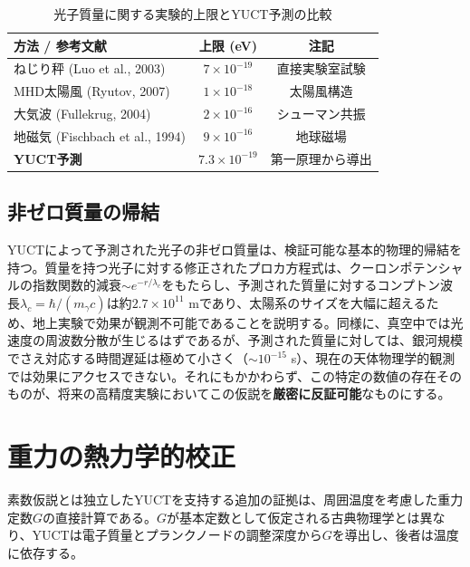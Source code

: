 \documentclass[11pt,a4paper]{article}
\begin{document}
	\begin{table}[h!]
		\centering
		\caption{光子質量に関する実験的上限とYUCT予測の比較}
		\label{tab:photon_limits}
		\small
		\begin{tabular}{lcc}
			\toprule
			\textbf{方法 / 参考文献} & \textbf{上限 (eV)} & \textbf{注記} \\
			\midrule
			ねじり秤 (Luo et al., 2003) & $7\times10^{-19}$ & 直接実験室試験 \\
			MHD太陽風 (Ryutov, 2007) & $1\times10^{-18}$ & 太陽風構造 \\
			大気波 (Fullekrug, 2004) & $2\times10^{-16}$ & シューマン共振 \\
			地磁気 (Fischbach et al., 1994) & $9\times10^{-16}$ & 地球磁場 \\
			\midrule
			\textbf{YUCT予測} & \textbf{$7.3\times10^{-19}$} & 第一原理から導出 \\
			\bottomrule
		\end{tabular}
	\end{table}
	
	\subsection{非ゼロ質量の帰結}
	YUCTによって予測された光子の非ゼロ質量は、検証可能な基本的物理的帰結を持つ。質量を持つ光子に対する修正されたプロカ方程式\cite{Proca1936}は、クーロンポテンシャルの指数関数的減衰$\sim e^{-r/\lambda_c}$をもたらし、予測された質量に対するコンプトン波長$\lambda_c = \hbar / (m_\gamma c)$は約$2.7 \times 10^{11}$ mであり、太陽系のサイズを大幅に超えるため、地上実験で効果が観測不可能であることを説明する。同様に、真空中では光速度の周波数分散が生じるはずであるが、予測された質量に対しては、銀河規模でさえ対応する時間遅延は極めて小さく（$\sim 10^{-15}$ s）、現在の天体物理学的観測では効果にアクセスできない。それにもかかわらず、この特定の数値の存在そのものが、将来の高精度実験においてこの仮説を\textbf{厳密に反証可能}なものにする。
	
	\section{重力の熱力学的校正}
	\label{sec:thermal_gravity}
	
	素数仮説とは独立したYUCTを支持する追加の証拠は、周囲温度を考慮した重力定数$G$の直接計算である。$G$が基本定数として仮定される古典物理学とは異なり、YUCTは電子質量とプランクノードの調整深度から$G$を導出し、後者は温度に依存する。
	
\end{document}
